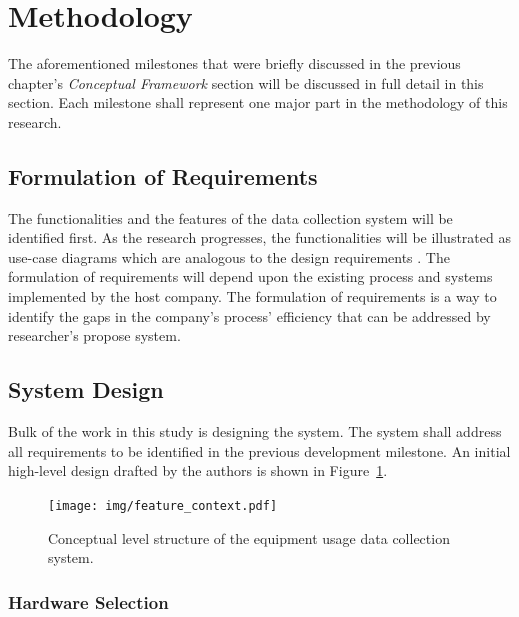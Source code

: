 \documentclass[12pt]{report}
\begin{document}
\section{Methodology}

The aforementioned milestones that were briefly discussed in the previous chapter's \textit{Conceptual Framework} section will be discussed in full detail in this section.
Each milestone shall represent one major part in the methodology of this research.

\subsection{Formulation of Requirements}

The functionalities and the features of the data collection system will be identified first.
As the research progresses, the functionalities will be illustrated as use-case diagrams which are analogous to the design requirements \cite{UseCase}.
The formulation of requirements will depend upon the existing process and systems implemented by the host company.
The formulation of requirements is a way to identify the gaps in the company's process' efficiency that can be addressed by researcher's propose system.

\subsection{System Design}

Bulk of the work in this study is designing the system.
The system shall address all requirements to be identified in the previous development milestone.
An initial high-level design drafted by the authors is shown in Figure~\ref{fig:concept_structure}.

\begin{figure}[H]
    \centering
    \texttt{[image: img/feature\_context.pdf]}
    \caption{Conceptual level structure of the equipment usage data collection system.}
    \label{fig:concept_structure}
\end{figure}

\subsubsection{Hardware Selection}
\end{document}
